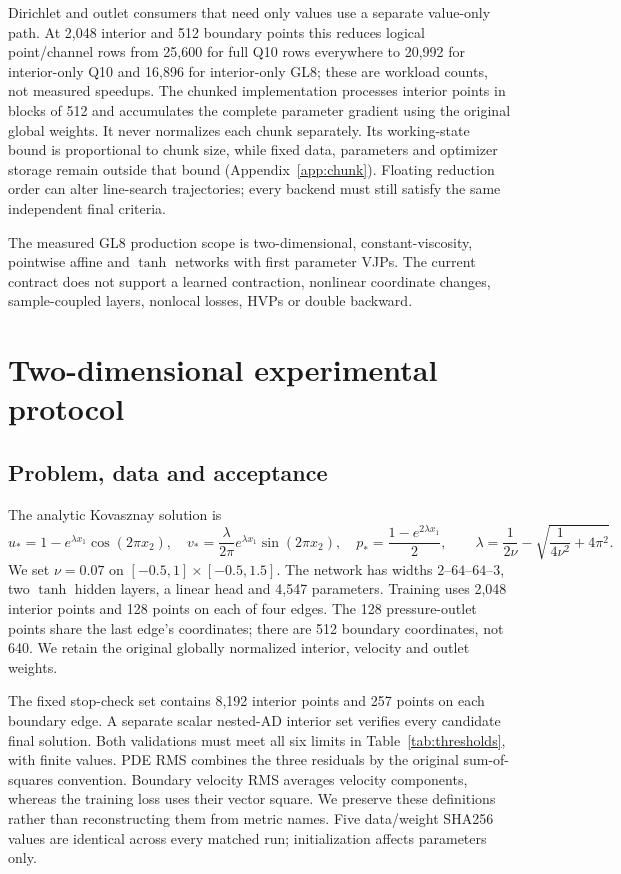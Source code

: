 \documentclass[11pt]{article}
\begin{document}
Dirichlet and outlet consumers that need only values use a separate
value-only path. At 2,048 interior and 512 boundary points this reduces
logical point/channel rows from 25,600 for full Q10 rows everywhere to
20,992 for interior-only Q10 and 16,896 for interior-only GL8; these are
workload counts, not measured speedups. The chunked implementation
processes interior points in blocks of 512 and accumulates the complete
parameter gradient using the original global weights. It never normalizes
each chunk separately. Its working-state bound is proportional to chunk
size, while fixed data, parameters and optimizer storage remain outside
that bound (Appendix~\ref{app:chunk}). Floating reduction order can alter
line-search trajectories; every backend must still satisfy the same
independent final criteria.

The measured GL8 production scope is two-dimensional, constant-viscosity,
pointwise affine and $\tanh$ networks with first parameter VJPs. The current
contract does not support a learned contraction, nonlinear coordinate
changes, sample-coupled layers, nonlocal losses, HVPs or double backward.

\section{Two-dimensional experimental protocol}
\subsection{Problem, data and acceptance}
The analytic Kovasznay solution is
\begin{equation}
u_*=1-e^{\lambda x_1}\cos(2\pi x_2),\quad
v_*=\frac{\lambda}{2\pi}e^{\lambda x_1}\sin(2\pi x_2),\quad
p_*=\frac{1-e^{2\lambda x_1}}{2},\qquad
\lambda=\frac{1}{2\nu}-\sqrt{\frac{1}{4\nu^2}+4\pi^2}.
\end{equation}
We set $\nu=0.07$ on $[-0.5,1]\times[-0.5,1.5]$. The network has widths
$2$--$64$--$64$--$3$, two $\tanh$ hidden layers, a linear head and 4,547
parameters. Training uses 2,048 interior points and 128 points on each of
four edges. The 128 pressure-outlet points share the last edge's coordinates;
there are 512 boundary coordinates, not 640. We retain the original globally
normalized interior, velocity and outlet weights.

The fixed stop-check set contains 8,192 interior points and 257 points on
each boundary edge. A separate scalar nested-AD interior set verifies every
candidate final solution. Both validations must meet all six limits in
Table~\ref{tab:thresholds}, with finite values. PDE RMS combines the three
residuals by the original sum-of-squares convention. Boundary velocity RMS
averages velocity components, whereas the training loss uses their vector
square. We preserve these definitions rather than reconstructing them from
metric names. Five data/weight SHA256 values are identical across every
matched run; initialization affects parameters only.
\end{document}
